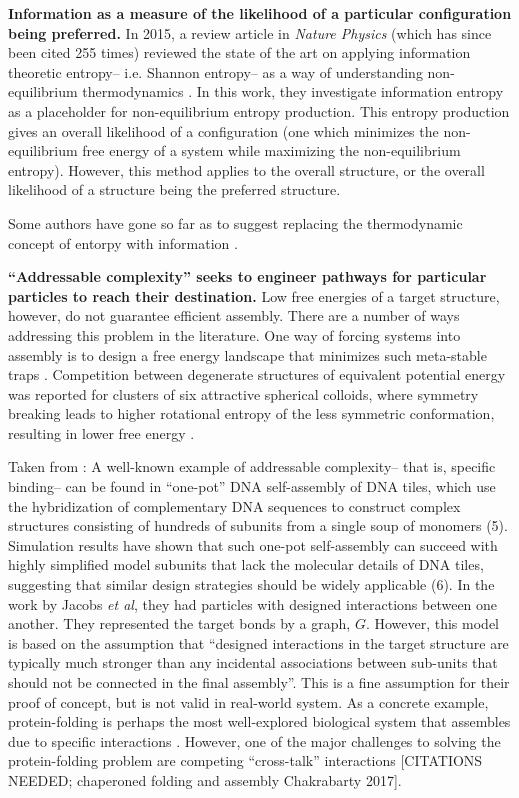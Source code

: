 \textbf{Information as a measure of the likelihood of a particular configuration being preferred.}
In 2015, a review article in \textit{Nature Physics} (which has since been cited 255 times) reviewed the state of the art on applying information theoretic entropy-- i.e. Shannon entropy-- as a way of understanding non-equilibrium thermodynamics \cite{Parrondo_2015_NaturePhysics}.
In this work, they investigate information entropy as a placeholder for non-equilibrium entropy production.
This entropy production gives an overall likelihood of a configuration (one which minimizes the non-equilibrium free energy of a system while maximizing the non-equilibrium entropy).
However, this method applies to the overall structure, or the overall likelihood of a structure being the preferred structure.

Some authors have gone so far as to suggest replacing the thermodynamic concept of entorpy with information \cite{AFarewelltoEntropy}.

\textbf{``Addressable complexity'' seeks to engineer pathways for particular particles to reach their destination.}
Low free energies of a target structure, however, do not guarantee efficient assembly.
There are a number of ways addressing this problem in the literature.
One way of forcing systems into assembly is to design a free energy landscape that minimizes such meta-stable traps \cite{Wales_2017_JChemPhys}.
Competition between degenerate structures of equivalent potential energy was reported for clusters of six attractive spherical colloids, where symmetry breaking leads to higher rotational entropy of the less symmetric conformation, resulting in lower free energy \cite{Meng_2010_Science}.

Taken from \cite{Jacobs_2015_JChemPhys}: 
A well-known example of addressable complexity-- that is, specific binding-- can be found in ``one-pot'' DNA self-assembly of DNA tiles, which use the hybridization of complementary DNA sequences to construct complex structures consisting of hundreds of subunits from a single soup of monomers \cite{Ke_2012_Science} (5).
Simulation results have shown that such one-pot self-assembly can succeed with highly simplified model subunits that lack the molecular details of DNA tiles, suggesting that similar design strategies should be widely applicable \cite{Reinhardt_2014_PRL} (6).
In the work by Jacobs \textit{et al}, they had particles with designed interactions between one another.
They represented the target bonds by a graph, $G$.
However, this model is based on the assumption that ``designed interactions in the target structure are typically much stronger than any incidental associations between sub-units that should not be connected in the final assembly''.
This is a fine assumption for their proof of concept, but is not valid in real-world system.
As a concrete example, protein-folding is perhaps the most well-explored biological system that assembles due to specific interactions \cite{Dill_1993_CurrOpinStructBiol}.
However, one of the major challenges to solving the protein-folding problem are competing ``cross-talk'' interactions [CITATIONS NEEDED; chaperoned folding and assembly Chakrabarty 2017].

